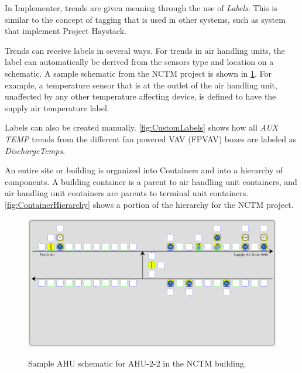 In Implementer, trends are given meaning through the use of
\textit{Labels}. This is similar to the concept of tagging that is used
in other systems, such as system that implement Project Haystack. 

Trends can receive labels in several ways. For trends in air handling
units, the label can automatically be derived from the sensors type and
location on a schematic. A sample schematic from the NCTM project is
shown in \figref{} \ref{fig:AHUSchematic}. For example, a temperature
sensor that is at the outlet of the air handling unit, unaffected by any
other temperature affecting device, is defined to have the supply air
temperature label. 

Labels can also be created manually. \figref{} \ref{fig:CustomLabels}
shows how all \textit{AUX TEMP} trends from the different fan powered
VAV (FPVAV) boxes are labeled as \textit{DischargeTemps}.

An entire site or building is organized into Containers and into a
hierarchy of components. A building container is a parent to air
handling unit containers, and air handling unit containers are parents
to terminal unit containers. \figref{} \ref{fig:ContainerHierarchy}
shows a portion of the hierarchy for the NCTM project.




\begin{figure}
\centering
\includegraphics[scale=0.5]{Images/SampleAHUSchematic.PNG}
\label{fig:AHUSchematic}
\caption{Sample AHU schematic for AHU-2-2 in the NCTM building.}
\end{figure}

